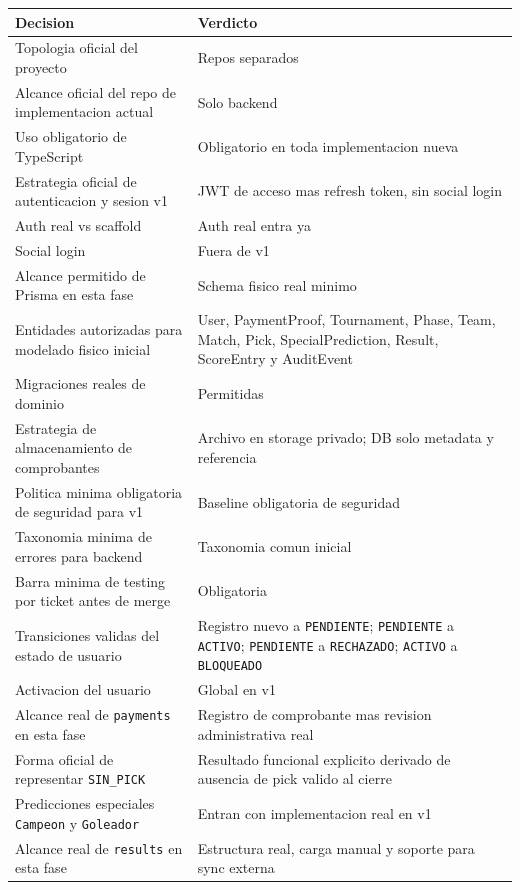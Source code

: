 \begin{longtable}{p{}p{}}
\toprule
\textbf{Decision} & \textbf{Verdicto} \\
\midrule
Topologia oficial del proyecto & Repos separados \\
Alcance oficial del repo de implementacion actual & Solo backend \\
Uso obligatorio de TypeScript & Obligatorio en toda implementacion nueva \\
Estrategia oficial de autenticacion y sesion v1 & JWT de acceso mas refresh token, sin social login \\
Auth real vs scaffold & Auth real entra ya \\
Social login & Fuera de v1 \\
Alcance permitido de Prisma en esta fase & Schema fisico real minimo \\
Entidades autorizadas para modelado fisico inicial & User, PaymentProof, Tournament, Phase, Team, Match, Pick, SpecialPrediction, Result, ScoreEntry y AuditEvent \\
Migraciones reales de dominio & Permitidas \\
Estrategia de almacenamiento de comprobantes & Archivo en storage privado; DB solo metadata y referencia \\
Politica minima obligatoria de seguridad para v1 & Baseline obligatoria de seguridad \\
Taxonomia minima de errores para backend & Taxonomia comun inicial \\
Barra minima de testing por ticket antes de merge & Obligatoria \\
Transiciones validas del estado de usuario & Registro nuevo a \texttt{PENDIENTE}; \texttt{PENDIENTE} a \texttt{ACTIVO}; \texttt{PENDIENTE} a \texttt{RECHAZADO}; \texttt{ACTIVO} a \texttt{BLOQUEADO} \\
Activacion del usuario & Global en v1 \\
Alcance real de \texttt{payments} en esta fase & Registro de comprobante mas revision administrativa real \\
Forma oficial de representar \texttt{SIN\_PICK} & Resultado funcional explicito derivado de ausencia de pick valido al cierre \\
Predicciones especiales \texttt{Campeon} y \texttt{Goleador} & Entran con implementacion real en v1 \\
Alcance real de \texttt{results} en esta fase & Estructura real, carga manual y soporte para sync externa \\

\end{longtable}
